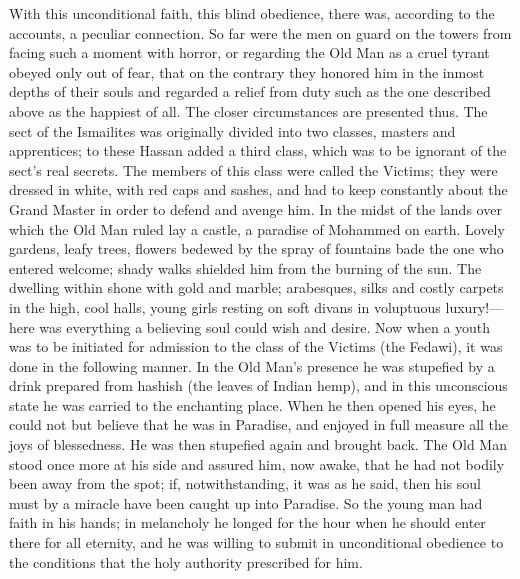 \documentclass[12pt,a4paper,openany]{book}
\newcommand{\opage}[1]{\marginnote{\footnotesize\textit{[#1]}}}
\begin{document}
With this unconditional faith, this blind obedience, there was, according
to the accounts, a peculiar connection. So far were the men on guard on
the towers from facing such a moment with horror, or regarding the Old
Man as a cruel tyrant obeyed only out of fear, that on the contrary they
honored him in the inmost depths of their souls and regarded a relief
from duty such as the one described above as the happiest of all. The
closer circumstances are presented thus. The sect of the Ismailites was
originally divided into two classes, masters and apprentices; to these
Hassan added a third class, which was to be ignorant of the sect's real
secrets. The members of this class were called the Victims; they were
dressed in white, with red caps and sashes, and had to keep constantly
about the Grand Master in order to defend and avenge him. In the midst of
the lands over which the Old Man ruled lay a castle, a paradise of
Mohammed on earth. Lovely gardens, leafy trees, flowers bedewed by the
spray of fountains bade the one who entered welcome; shady walks shielded
him \opage{20}from the burning of the sun. The dwelling within shone with gold and
marble; arabesques, silks and costly carpets in the high, cool halls,
young girls resting on soft divans in voluptuous luxury!---here was
everything a believing soul could wish and desire. Now when a youth was
to be initiated for admission to the class of the Victims (the
Fedawi), it was done in the following manner. In the Old Man's presence
he was stupefied by a drink prepared from hashish (the leaves of Indian
hemp), and in this unconscious state he was carried to the enchanting
place. When he then opened his eyes, he could not but believe that he
was in Paradise, and enjoyed in full measure all the joys of
blessedness. He was then stupefied again and brought back. The Old Man
stood once more at his side and assured him, now awake, that he had not
bodily been away from the spot; if, notwithstanding, it was as he said,
then his soul must by a miracle have been caught up into Paradise. So the
young man had faith in his hands; in melancholy he longed for the hour
when he should enter there for all eternity, and he was willing to submit
in unconditional obedience to the conditions that the holy authority
prescribed for him.
\end{document}
